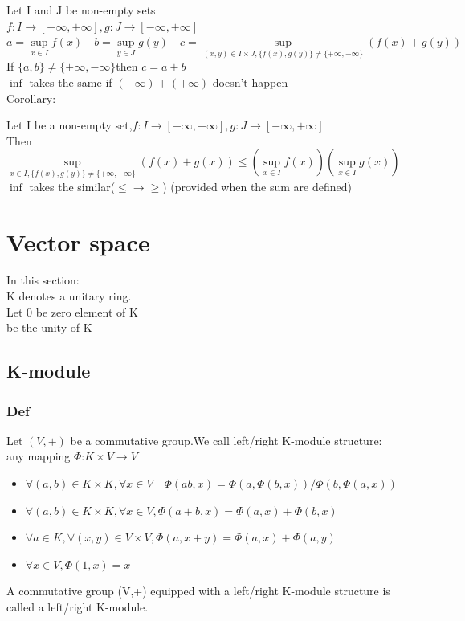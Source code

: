 \documentclass{book}
\begin{document}
Let I and J be non-empty sets\\
\indent$f:I\rightarrow[-\infty,+\infty],g:J\rightarrow[-\infty,+\infty]$\\
\indent$a=\sup\limits_{x\in I}f(x)\quad b=\sup\limits_{y\in J}g(y)\quad c=\sup\limits_{(x,y)\in I\times J,\{f(x),g(y)\}\not=\{+\infty,-\infty\}}(f(x)+g(y))$ \\
\indent If $\{a,b\}\not=\{+\infty,-\infty\}$then $c=a+b$\\
\indent $\inf$ takes the same if $(-\infty)+(+\infty)$ doesn't happen\\
Corollary:

Let I be a non-empty set,$f:I\rightarrow[-\infty,+\infty],g:J\rightarrow[-\infty,+\infty]$\\
Then $\sup\limits_{x\in I,\{f(x),g(y)\}\not=\{+\infty,-\infty\}}(f(x)+g(x))\leq(\sup\limits_{x\in I}f(x))(\sup\limits_{x\in I}g(x))$\\
\indent $\inf$ takes the similar($\leq\rightarrow\geq$) (provided when the sum are defined)
\chapter{Vector space}
In this section:\\
\indent K denotes a unitary ring.\\
\indent Let 0 be zero element of K\\
 be the unity of K
\section{K-module}
\subsection{Def}

Let $(V,+)$ be a commutative group.We call left/right K-module structure:\\
\indent any mapping $\Phi$:$K\times V\rightarrow V$
\begin{itemize}
    \item $\forall(a,b)\in K\times K,\forall x\in V\quad \Phi(ab,x)=\Phi(a,\Phi(b,x))/\Phi(b,\Phi(a,x))$
    \item $\forall (a,b)\in K\times K,\forall x\in V,\Phi(a+b,x)=\Phi(a,x)+\Phi(b,x)$
    \item $\forall a\in K,\forall(x,y)\in V\times V,\Phi(a,x+y)=\Phi(a,x)+\Phi(a,y)$
    \item $\forall x\in V,\Phi(1,x)=x$
\end{itemize}
A commutative group (V,+) equipped with a left/right K-module structure is called a left/right K-module.
\end{document}
